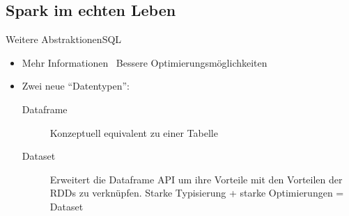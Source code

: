 \subsection{Spark im echten Leben}
\begin{frame}{Weitere Abstraktionen}{SQL}
	\begin{itemize}
		\item Mehr Informationen \rightarrow~Bessere Optimierungsmöglichkeiten
		\item Zwei neue \enquote{Datentypen}:
		\begin{description}
			\item[Dataframe] Konzeptuell equivalent zu einer Tabelle
			\item[Dataset] Erweitert die Dataframe API um ihre Vorteile mit den Vorteilen der RDDs zu verknüpfen. Starke Typisierung + starke Optimierungen = Dataset
		\end{description}
	\end{itemize}
\end{frame}

